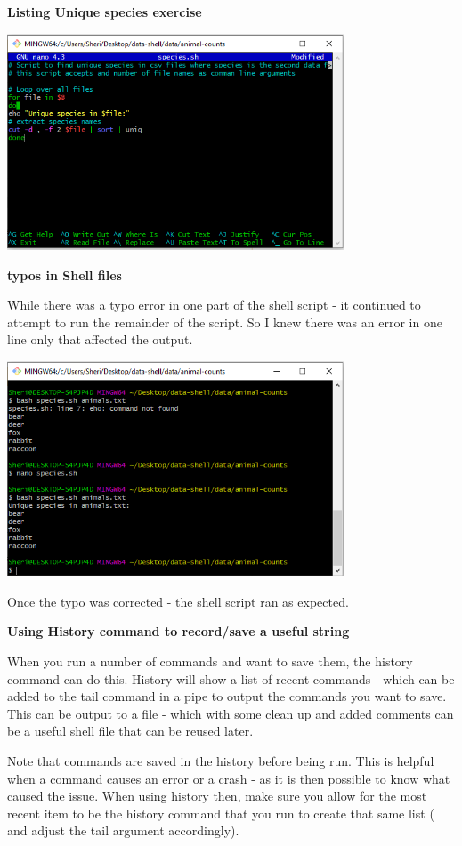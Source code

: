 \documentclass{article}
\begin{document}
\textbf{Listing Unique species exercise}

\includegraphics[width=10cm]{Images/GitBash_059.PNG}

\textbf{typos in Shell files}
\label{Error: Typos in Shell files}

While there was a typo error in one part of the shell script - it continued to attempt to run the remainder of the script. So I knew there was an error in one line only that affected the output.

\includegraphics[width=10cm]{Images/GitBash_060.PNG}

Once the typo was corrected - the shell script ran as expected. 

\textbf{Using History command to record/save a useful string}

When you run a number of commands and want to save them, the history command can do this. History will show a list of recent commands - which can be added to the tail command in a pipe to output the commands you want to save. This can be output to a file - which with some clean up and added comments can be a useful shell file that can be reused later.

Note that commands are saved in the history before being run. This is helpful when a command causes an error or a crash - as it is then possible to know what caused the issue. When using history then, make sure you allow for the most recent item to be the history command that you run to create that same list ( and adjust the tail argument accordingly).
\end{document}
